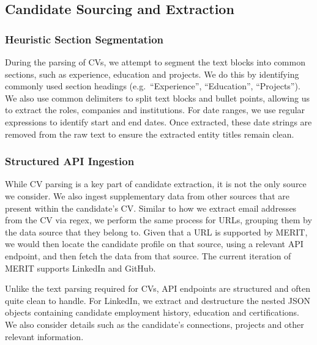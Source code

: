 \subsection{Candidate Sourcing and Extraction}

\subsubsection{Heuristic Section Segmentation}
During the parsing of CVs, we attempt to segment the text blocks into common sections, such as experience, education and projects.
We do this by identifying commonly used section headings (e.g.\ ``Experience'', ``Education'', ``Projects''). We also use common
delimiters to split text blocks and bullet points, allowing us to extract the roles, companies and institutions. For date
ranges, we use regular expressions to identify start and end dates. Once extracted, these date strings
are removed from the raw text to ensure the extracted entity titles remain clean.

\subsubsection{Structured API Ingestion}
While CV parsing is a key part of candidate extraction, it is not the only source we consider. We also ingest supplementary data from other sources
that are present within the candidate's CV. Similar to how we extract email addresses from the CV via regex, we perform the same process for URLs, 
grouping them by the data source that they belong to. Given that a URL is supported by MERIT, we would then locate the candidate profile on that source,
using a relevant API endpoint, and then fetch the data from that source. The current iteration of MERIT supports LinkedIn and GitHub.

Unlike the text parsing required for CVs, API endpoints are structured and often quite clean to handle. For LinkedIn, we extract and destructure
the nested JSON objects containing candidate employment history, education and certifications. We also consider details such as the candidate's connections,
projects and other relevant information. 

